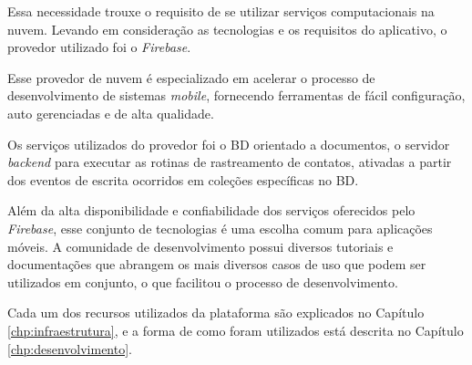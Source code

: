 Essa necessidade trouxe o requisito de se utilizar serviços computacionais na nuvem. Levando em consideração as tecnologias e os requisitos do aplicativo, o provedor utilizado foi o \textit{Firebase}.

Esse provedor de nuvem é especializado em acelerar o processo de desenvolvimento de sistemas \textit{mobile}, fornecendo ferramentas de fácil configuração, auto gerenciadas e de alta qualidade.

Os serviços utilizados do provedor foi o BD orientado a documentos, o servidor \textit{backend} para executar as rotinas de rastreamento de contatos, ativadas a partir dos eventos de escrita ocorridos em coleções específicas no BD.

Além da alta disponibilidade e confiabilidade dos serviços oferecidos pelo \textit{Firebase}, esse conjunto de tecnologias é uma escolha comum para aplicações móveis. A comunidade de desenvolvimento possui diversos tutoriais e documentações que abrangem os mais diversos casos de uso que podem ser utilizados em conjunto, o que facilitou o processo de desenvolvimento.

Cada um dos recursos utilizados da plataforma são explicados no Capítulo \ref{chp:infraestrutura}, e a forma de como foram utilizados está descrita no Capítulo \ref{chp:desenvolvimento}.